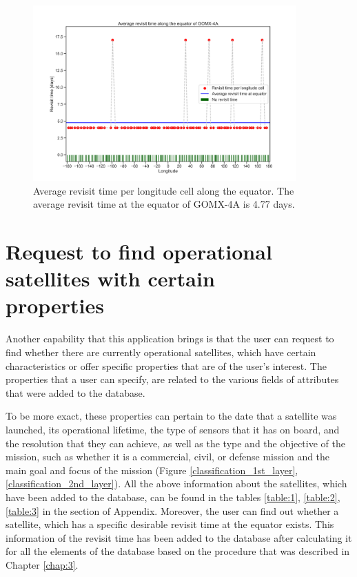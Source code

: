 \begin{figure}
\centering
\includegraphics[width=0.9\textwidth]{Images/revisit_time_of_GOMX-4A.png}
\caption{Average revisit time per longitude cell along the equator. The average revisit time at the equator of GOMX-4A is 4.77 days.}
\label{revisit_time_of_GOMX-4A}
\end{figure}

\bigskip
\section{Request to find operational satellites with certain \\properties}
\bigskip

Another capability that this application brings is that the user can request to find whether there are currently operational satellites, which have certain characteristics or offer specific properties that are of the user's interest. The properties that a user can specify, are related to the various fields of attributes that were added to the database.

To be more exact, these properties can pertain to the date that a satellite was launched, its operational lifetime, the type of sensors that it has on board, and the resolution that they can achieve, as well as the type and the objective of the mission, such as whether it is a commercial, civil, or defense mission and the main goal and focus of the mission (Figure \ref{classification_1st_layer}, \ref{classification_2nd_layer}). All the above information about the satellites, which have been added to the database, can be found in the tables \ref{table:1}, \ref{table:2}, \ref{table:3} in the section of Appendix. Moreover, the user can find out whether a satellite, which has a specific desirable revisit time at the equator exists. This information of the revisit time has been added to the database after calculating it for all the elements of the database based on the procedure that was described in Chapter \ref{chap:3}.

